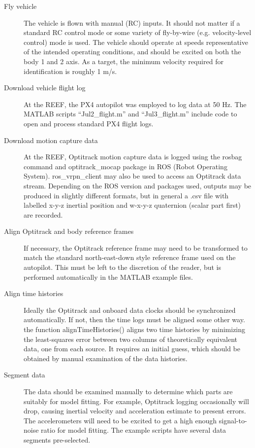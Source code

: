 \documentclass{article}
\begin{document}
\begin{description}
\item[Fly vehicle] The vehicle is flown with manual (RC) inputs. It should not matter if a standard RC control mode or some variety of fly-by-wire (e.g. velocity-level control) mode is used. The vehicle should operate at speeds representative of the intended operating conditions, and should be excited on both the body 1 and 2 axis. As a target, the minimum velocity required for identification is roughly 1 m/s.
\item[Download vehicle flight log] At the REEF, the PX4 autopilot was employed to log data at 50 Hz. The MATLAB scripts ``Jul2\_flight.m'' and ``Jul3\_flight.m'' include code to open and process standard PX4 flight logs.
\item[ Download motion capture data ] At the REEF, Optitrack motion capture data is logged using the {\pica rosbag} command and {\pica optitrack\_mocap} package in ROS (Robot Operating System). {\pica ros\_vrpn\_client} may also be used to access an Optitrack data stream. Depending on the ROS version and packages used, outputs may be produced in slightly different formats, but in general a .csv file with labelled x-y-z inertial position and w-x-y-z quaternion (scalar part first) are recorded.
\item[ Align Optitrack and body reference frames] If necessary, the Optitrack reference frame may need to be transformed to match the standard north-east-down style reference frame used on the autopilot. This must be left to the discretion of the reader, but is performed automatically in the MATLAB example files.
\item[ Align time histories ] Ideally the Optitrack and onboard data clocks should be synchronized automatically. If not, then the time logs must be aligned some other way. the function {\pica alignTimeHistories()} aligns two time histories by minimizing the least-squares error between two columns of theoretically equivalent data, one from each source. It requires an initial guess, which should be obtained by manual examination of the data histories.
\item[ Segment data ] The data should be examined manually to determine which parts are suitably for model fitting. For example, Optitrack logging occasionally will drop, causing inertial velocity and acceleration estimate to present errors. The accelerometers will need to be excited to get a high enough signal-to-noise ratio for model fitting. The example scripts have several data segments pre-selected.

\end{description}
\end{document}
